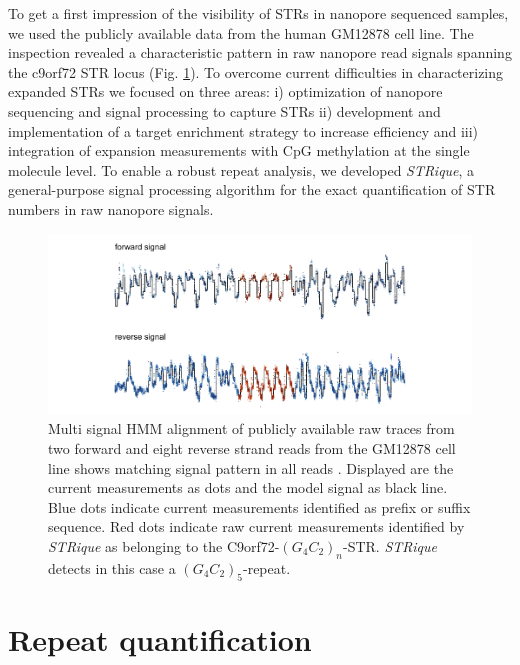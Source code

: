 To get a first impression of the visibility of STRs in nanopore sequenced samples, we used the publicly available data from the human GM12878 cell line. The inspection revealed a characteristic pattern in raw nanopore read signals spanning the c9orf72 STR locus (Fig. \ref{fig:strique:signal}). 
To overcome current difficulties in characterizing expanded STRs we focused on three areas: i) optimization of nanopore sequencing and signal processing to capture STRs ii) development and implementation of a target enrichment strategy to increase efficiency and iii) integration of expansion measurements with CpG methylation at the single molecule level.
To enable a robust repeat analysis, we developed \textit{STRique}, a general-purpose signal processing algorithm for the exact quantification of STR numbers in raw nanopore signals.

\begin{figure}[h]
	\centering
	\includegraphics[width=1.0\textwidth]{figures/strique/signal.pdf}
	\captionsetup{format=plain}
	\caption[Nanopore raw signal of the C9orf72 STR in GM12878 cells]{Multi signal HMM alignment of publicly available raw traces from two forward and eight reverse strand reads from the GM12878 cell line shows matching signal pattern in all reads \cite{Jain2018}. Displayed are the current measurements as dots and the model signal as black line. Blue dots indicate current measurements identified as prefix or suffix sequence. Red dots indicate raw current measurements identified by \textit{STRique} as belonging to the C9orf72-$ (G_{4}C_{2})_{n} $-STR. \textit{STRique} detects in this case a $ (G_{4}C_{2})_{5} $-repeat.}
	\label{fig:strique:signal}
\end{figure}




\section{Repeat quantification}
\label{sec:strique:quantification}

